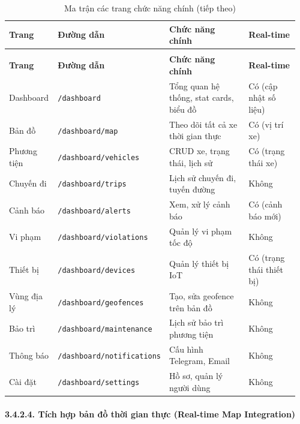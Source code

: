 \documentclass[a4paper]{extarticle}
\newcommand{\thesissettableid}[2]{%
  \renewcommand{\thetable}{#1}%
  \renewcommand{\theHtable}{#2}%
}
\begin{document}
{\thesissettableid{3.27}{tab-ch3-ma-tran-cac-trang-chuc-nang-chinh}
\def\LTcaptype{table}
\begin{longtable}{|L{0.179\linewidth}|L{0.158\linewidth}|L{0.385\linewidth}|L{0.233\linewidth}|}
\caption{Ma trận các trang chức năng chính}\label{tab:ch3-ma-tran-cac-trang-chuc-nang-chinh}\\
\hline \textbf{Trang} & \textbf{Đường dẫn} & \textbf{Chức năng chính} & \textbf{Real-time} \\
\hline
\endfirsthead
\caption[]{Ma trận các trang chức năng chính (tiếp theo)}\\
\hline \textbf{Trang} & \textbf{Đường dẫn} & \textbf{Chức năng chính} & \textbf{Real-time} \\
\hline
\endhead
\hline
\endfoot
\endlastfoot
Dashboard & \texttt{/dashboard} & Tổng quan hệ thống, stat cards, biểu
đồ & Có (cập nhật số liệu) \\\hline
Bản đồ & \nolinkurl{/dashboard/map} & Theo dõi tất cả xe thời gian thực &
Có (vị trí xe) \\\hline
Phương tiện & \nolinkurl{/dashboard/vehicles} & CRUD xe, trạng thái, lịch
sử & Có (trạng thái xe) \\\hline
Chuyến đi & \nolinkurl{/dashboard/trips} & Lịch sử chuyến đi, tuyến đường &
Không \\\hline
Cảnh báo & \nolinkurl{/dashboard/alerts} & Xem, xử lý cảnh báo & Có (cảnh
báo mới) \\\hline
Vi phạm & \nolinkurl{/dashboard/violations} & Quản lý vi phạm tốc độ &
Không \\\hline
Thiết bị & \nolinkurl{/dashboard/devices} & Quản lý thiết bị IoT & Có
(trạng thái thiết bị) \\\hline
Vùng địa lý & \nolinkurl{/dashboard/geofences} & Tạo, sửa geofence trên bản
đồ & Không \\\hline
Bảo trì & \nolinkurl{/dashboard/maintenance} & Lịch sử bảo trì phương tiện
& Không \\\hline
Thông báo & \nolinkurl{/dashboard/notifications} & Cấu hình Telegram, Email
& Không \\\hline
Cài đặt & \nolinkurl{/dashboard/settings} & Hồ sơ, quản lý người dùng &
Không \\\hline
\end{longtable}
}


\paragraph{3.4.2.4. Tích hợp bản đồ thời gian thực (Real-time Map
Integration)}\label{3244-tuxedch-hux1ee3p-bux1ea3n-ux111ux1ed3-thux1eddi-gian-thux1ef1c-real-time-map-integration}
\end{document}
